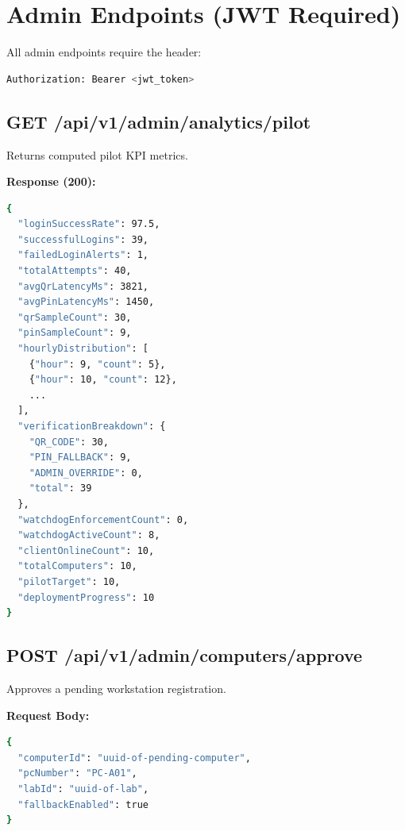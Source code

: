 \section{Admin Endpoints (JWT Required)}

All admin endpoints require the header:
\begin{tcolorbox}[codebox, title={Authorization Header}]
\begin{lstlisting}[language=bash]
Authorization: Bearer <jwt_token>
\end{lstlisting}
\end{tcolorbox}

\subsection{GET /api/v1/admin/analytics/pilot}
Returns computed pilot KPI metrics.

\textbf{Response (200):}
\begin{tcolorbox}[codebox, title={Response}]
\begin{lstlisting}[language=bash]
{
  "loginSuccessRate": 97.5,
  "successfulLogins": 39,
  "failedLoginAlerts": 1,
  "totalAttempts": 40,
  "avgQrLatencyMs": 3821,
  "avgPinLatencyMs": 1450,
  "qrSampleCount": 30,
  "pinSampleCount": 9,
  "hourlyDistribution": [
    {"hour": 9, "count": 5},
    {"hour": 10, "count": 12},
    ...
  ],
  "verificationBreakdown": {
    "QR_CODE": 30,
    "PIN_FALLBACK": 9,
    "ADMIN_OVERRIDE": 0,
    "total": 39
  },
  "watchdogEnforcementCount": 0,
  "watchdogActiveCount": 8,
  "clientOnlineCount": 10,
  "totalComputers": 10,
  "pilotTarget": 10,
  "deploymentProgress": 10
}
\end{lstlisting}
\end{tcolorbox}

\subsection{POST /api/v1/admin/computers/approve}
Approves a pending workstation registration.

\textbf{Request Body:}
\begin{tcolorbox}[codebox, title={Request}]
\begin{lstlisting}[language=bash]
{
  "computerId": "uuid-of-pending-computer",
  "pcNumber": "PC-A01",
  "labId": "uuid-of-lab",
  "fallbackEnabled": true
}
\end{lstlisting}
\end{tcolorbox}

